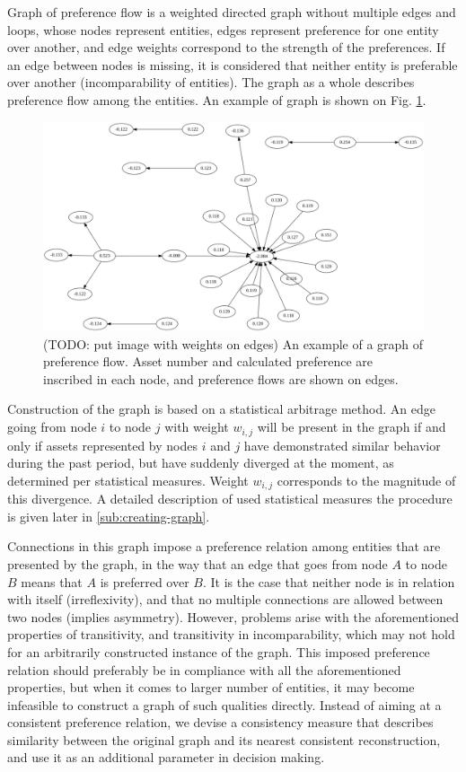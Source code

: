 \documentclass[letterpaper, 10pt, conference]{ieeeconf}
\begin{document}
  Graph of preference flow is a weighted directed graph without multiple edges and loops, whose nodes represent entities, edges represent preference for one entity over another, and edge weights correspond to the strength of the preferences.
  If an edge between nodes is missing, it is considered that neither entity is preferable over another (incomparability of entities).
  The graph as a whole describes preference flow among the entities.
  An example of graph is shown on Fig. \ref{fig:graph}.
  
  \begin{figure}[h]
    \centering
    \includegraphics[width=\columnwidth]{graphics/graph.pdf}
    \caption{(TODO: put image with weights on edges) An example of a graph of preference flow. Asset number and calculated preference are inscribed in each node, and preference flows are shown on edges.}
    \label{fig:graph}
  \end{figure}

  Construction of the graph is based on a statistical arbitrage method.
  An edge going from node $i$ to node $j$ with weight $w_{i,j}$ will be present in the graph if and only if assets represented by nodes $i$ and $j$ have demonstrated similar behavior during the past period, but have suddenly diverged at the moment, as determined per statistical measures.
  Weight $w_{i,j}$ corresponds to the magnitude of this divergence.  
  A detailed description of used statistical measures the procedure is given later in \ref{sub:creating-graph}.
  
  Connections in this graph impose a preference relation among entities that are presented by the graph, in the way that an edge that goes from node $A$ to node $B$ means that $A$ is preferred over $B$.
  It is the case that neither node is in relation with itself (irreflexivity), and that no multiple connections are allowed between two nodes (implies asymmetry).
  However, problems arise with the aforementioned properties of transitivity, and transitivity in incomparability, which may not hold for an arbitrarily constructed instance of the graph.
  This imposed preference relation should preferably be in compliance with all the aforementioned properties, but when it comes to larger number of entities, it may become infeasible to construct a graph of such qualities directly.
  Instead of aiming at a consistent preference relation, we devise a consistency measure that describes similarity between the original graph and its nearest consistent reconstruction, and use it as an additional parameter in decision making.
  
\end{document}
